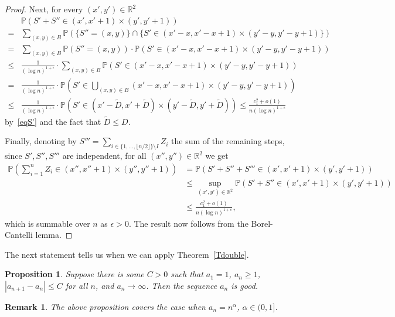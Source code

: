 \documentclass[12pt]{article}
\newtheorem{proposition}{Proposition}
\newtheorem{remark}{Remark}
\renewcommand\P{\mathbb{P}}
\newcommand\R{\mathbb{R}}
\begin{document}
\begin{proof}
Next, for every $(x',y')\in\R^2$
\begin{align*}
&\P\left(S'+S''\in (x',x'+1)\times (y',y'+1)\right)
\\=&\sum_{(x,y)\in B}\P(\{S''=(x,y)\}\cap\{S'\in (x'-x,x'-x+1)\times(y'-y,y'-y+1)\})
\\=&\sum_{(x,y)\in B}\P(S''=(x,y))\cdot \P(S'\in (x'-x,x'-x+1)\times(y'-y,y'-y+1))
\\ 
\le&\frac{1}{(\log n)^{1+\epsilon}}\cdot\sum_{(x,y)\in B}\P(S'\in (x'-x,x'-x+1)\times(y'-y,y'-y+1))
\\ 
=&\frac{1}{(\log n)^{1+\epsilon}}\cdot\P\left(S'\in \bigcup_{(x,y)\in B} (x'-x,x'-x+1)\times (y'-y,y'-y+1)\right)
\\ \le&\frac{1}{(\log n)^{1+\epsilon}}
         \cdot \P\left(S'\in (x'-\tilde D,x'+\tilde D)\times(y'-\tilde D,y'+\tilde D)\right)
         \leq\frac{c_1^2+o(1)}{n (\log n)^{1+\epsilon}}
    \end{align*}
by~\eqref{eqS'} and the fact that $\tilde D\le D$.

Finally, denoting by $S'''=\sum_{i\in\{1,\dots,\lfloor n/2\rfloor\}\setminus I}Z_i $ the  sum of the remaining steps, since $S',S'',S'''$ are independent, for all $(x'',y'')\in\R^2$ we get
\begin{align*}
\P\left(\sum_{i=1}^n Z_i\in(x'',x''+1)\times (y'',y''+1)\right)
&=
\P\left(S'+S''+S'''\in (x',x'+1)\times (y',y'+1)\right)
\\ &
\le \sup_{(x',y')\in\R^2} \P(S'+S''\in (x',x'+1)\times (y',y'+1))
\\ &\le \frac{ c_1^2+o(1)}{n(\log n)^{1+\epsilon}},
\end{align*}
which is summable over $n$ as $\epsilon>0$. The result now follows from the Borel-Cantelli lemma.
\end{proof}

The next statement tells us when we can apply Theorem~\ref{Tdouble}.
\begin{proposition}\label{propgood}
Suppose there is some $C>0$ such that $a_1=1$, $a_n\ge 1$, $|a_{n+1}-a_n|\le C$ for all $n$,  and $a_n\to\infty$. Then the sequence $a_n$ is good.
\end{proposition}
\begin{remark}
The above proposition covers the case when $a_n=n^\alpha$, $\alpha\in(0,1]$.
\end{remark}
\end{document}

